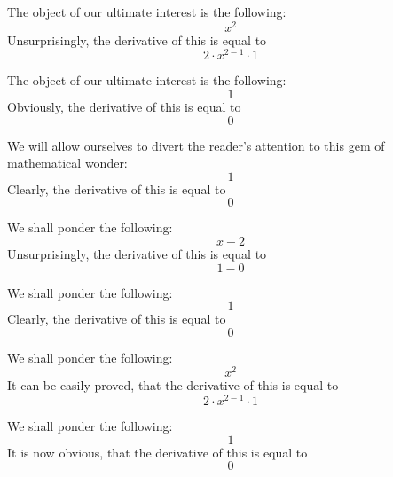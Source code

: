 \documentclass{article}
\begin{document}
The object of our ultimate interest is the following:
\begin{equation}
x ^{2 } 
\end{equation}
Unsurprisingly, the derivative of this is equal to
\begin{equation}
2 \cdot x ^{2 - 1 } \cdot 1 
\end{equation}

The object of our ultimate interest is the following:
\begin{equation}
1 
\end{equation}
Obviously, the derivative of this is equal to
\begin{equation}
0 
\end{equation}

We will allow ourselves to divert the reader's attention to this gem of mathematical wonder:
\begin{equation}
1 
\end{equation}
Clearly, the derivative of this is equal to
\begin{equation}
0 
\end{equation}

We shall ponder the following:
\begin{equation}
x - 2 
\end{equation}
Unsurprisingly, the derivative of this is equal to
\begin{equation}
1 - 0 
\end{equation}

We shall ponder the following:
\begin{equation}
1 
\end{equation}
Clearly, the derivative of this is equal to
\begin{equation}
0 
\end{equation}

We shall ponder the following:
\begin{equation}
x ^{2 } 
\end{equation}
It can be easily proved, that the derivative of this is equal to
\begin{equation}
2 \cdot x ^{2 - 1 } \cdot 1 
\end{equation}

We shall ponder the following:
\begin{equation}
1 
\end{equation}
It is now obvious, that the derivative of this is equal to
\begin{equation}
0 
\end{equation}
\end{document}
